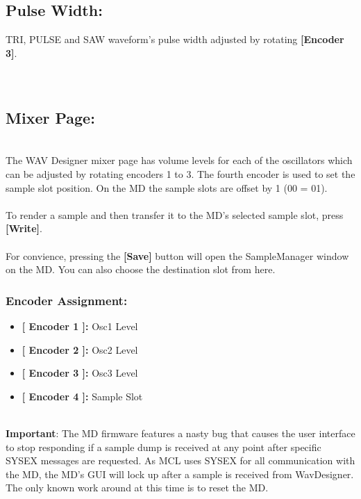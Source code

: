 \subsection{Pulse Width:}
TRI, PULSE and SAW waveform's pulse width adjusted by rotating \textbf{[Encoder 3]}.\\
\\\\
\subsection{Mixer Page:}
\\
The WAV Designer mixer page has volume levels for each of the oscillators which can be adjusted by rotating encoders 1 to 3. The fourth encoder is used to set the sample slot position. On the MD the sample slots are offset by 1 (00 = 01).\\
\\
To render a sample and then transfer it to the MD's selected sample slot, press \textbf{[Write]}.\\
\\
For convience, pressing the \textbf{[Save]} button will open the SampleManager window on the MD. You can also choose the destination slot from here.
\subsubsection{Encoder Assignment:}
\begin{itemize}
	\item \textbf{[ Encoder 1 ]: } Osc1 Level
	\item \textbf{[ Encoder 2 ]: } Osc2 Level
	\item \textbf{[ Encoder 3 ]: } Osc3 Level
	\item \textbf{[ Encoder 4 ]: } Sample Slot
\end{itemize}
\\
\textbf{Important}: The MD firmware features a nasty bug that causes the user interface to stop responding if a sample dump is received at any point after specific SYSEX messages are requested. As MCL uses SYSEX for all communication with the MD, the MD's GUI will lock up after a sample is received from WavDesigner. The only known work around at this time is to reset the MD.